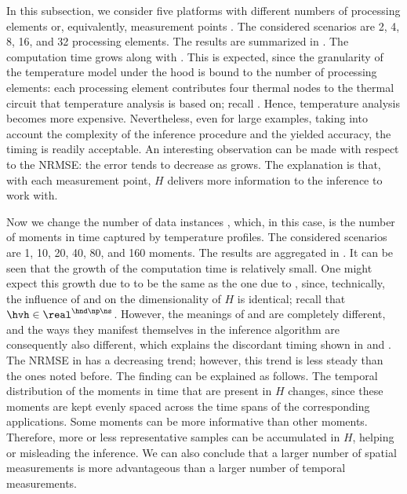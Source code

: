
In this subsection, we consider five platforms with different numbers of
processing elements or, equivalently, measurement points \np. The considered
scenarios are 2, 4, 8, 16, and 32 processing elements. The results are
summarized in . The computation time grows along with \np.
This is expected, since the granularity of the temperature model under the hood
is bound to the number of processing elements: each processing element
contributes four thermal nodes to the thermal  circuit that temperature
analysis is based on; recall . Hence, temperature
analysis becomes more expensive. Nevertheless, even for large examples, taking
into account the complexity of the inference procedure and the yielded accuracy,
the timing is readily acceptable. An interesting observation can be made with
respect to the \ac{NRMSE}: the error tends to decrease as \np grows. The
explanation is that, with each measurement point, $H$ delivers more information
to the inference to work with.


Now we change the number of data instances \ns, which, in this case, is the
number of moments in time captured by temperature profiles. The considered
scenarios are 1, 10, 20, 40, 80, and 160 moments. The results are aggregated in
. It can be seen that the growth of the computation time
is relatively small. One might expect this growth due to \ns to be the same as
the one due to \np, since, technically, the influence of \np and \ns on the
dimensionality of $H$ is identical; recall that $\hvh \in \real^{\hnd \np \ns}$.
However, the meanings of \np and \ns are completely different, and the ways they
manifest themselves in the inference algorithm are consequently also different,
which explains the discordant timing shown in  and
. The \ac{NRMSE} in  has a
decreasing trend; however, this trend is less steady than the ones noted before.
The finding can be explained as follows. The temporal distribution of the
moments in time that are present in $H$ changes, since these moments are kept
evenly spaced across the time spans of the corresponding applications. Some
moments can be more informative than other moments. Therefore, more or less
representative samples can be accumulated in $H$, helping or misleading the
inference. We can also conclude that a larger number of spatial measurements is
more advantageous than a larger number of temporal measurements.

